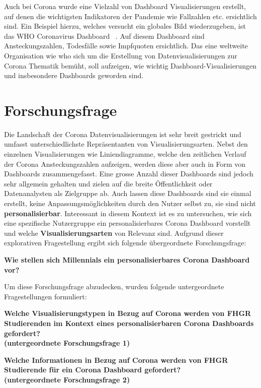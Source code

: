 \documentclass[12pt, oneside]{article}
\begin{document}
Auch bei Corona wurde eine Vielzahl von Dashboard Visualisierungen erstellt, auf denen die wichtigsten Indikatoren der Pandemie wie Fallzahlen etc. ersichtlich sind. Ein Beispiel hierzu, welches versucht ein globales Bild wiederzugeben, ist das WHO Coronavirus Dashboard ~\citep{WHO.23.04.2022}. Auf diesem Dashboard sind Ansteckungszahlen, Todesfälle sowie Impfquoten ersichtlich. Das eine weltweite Organisation wie \Gls{who} sich um die Erstellung von Datenvisualisierungen zur Corona Thematik bemüht, soll aufzeigen, wie wichtig Dashboard-Visualisierungen und insbesondere Dashboards geworden sind.
\clearpage

\section{Forschungsfrage}
Die Landschaft der Corona Datenvisualisierungen ist sehr breit gestrickt und umfasst unterschiedlichste Repräsentanten von Visualisierungsarten. Nebst den einzelnen Visualisierungen wie Liniendiagramme, welche den zeitlichen Verlauf der Corona Ansteckungszahlen aufzeigen, werden diese aber auch in Form von Dashboards zusammengefasst. Eine grosse Anzahl dieser Dashboards sind jedoch sehr allgemein gehalten und zielen auf die breite Öffentlichkeit oder Datenanalysten als Zielgruppe ab. Auch lassen diese Dashboards sind sie einmal erstellt, keine Anpassungsmöglichkeiten durch den Nutzer selbst zu, sie sind nicht \textbf{personalisierbar}. Interessant in diesem Kontext ist es zu untersuchen, wie sich eine spezifische Nutzergruppe ein personalisierbares Corona Dashboard vorstellt und welche \textbf{Visualisierungsarten} von Relevanz sind. Aufgrund dieser explorativen Fragestellung ergibt sich folgende übergeordnete Forschungsfrage:


\begin{center}
\textbf{Wie stellen sich Millennials ein personalisierbares Corona Dashboard vor?}
\end{center}

Um diese Forschungsfrage abzudecken, wurden folgende untergeordnete Fragestellungen formuliert:

\begin{center}
\textbf{Welche Visualisierungstypen in Bezug auf Corona werden von FHGR Studierenden im Kontext eines personalisierbaren Corona Dashboards gefordert?\\
(untergeordnete Forschungsfrage 1)}
\end{center}

\begin{center}
\textbf{Welche Informationen in Bezug auf Corona werden von FHGR Studierende für ein Corona Dashboard gefordert?\\
(untergeordnete Forschungsfrage 2)}
\end{center}
\end{document}
